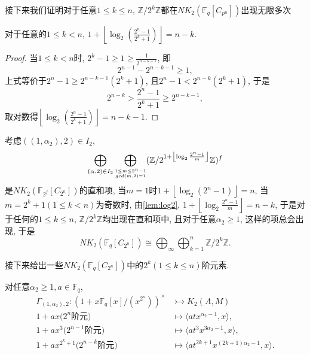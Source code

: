接下来我们证明对于任意$1\leq k\leq n$, $\mathbb{Z}/2^k \mathbb{Z}$都在$NK_2(\mathbb{F}_q[C_{p^n}])$出现无限多次

\begin{lemma}
\label{lem:log2}
	对于任意的$1\leq k < n$, $1+\left \lfloor \log_2(\frac{2^n-1}{2^k+1}) \right \rfloor = n-k$. 
\end{lemma}
\begin{proof}
	当$1\leq k < n$时, $2^k-1\geq 1 \geq \frac{1}{2^{n-k-1}}$, 即
	\[2^{n-1}-2^{n-k-1}\geq 1, \]
	上式等价于$2^n-1\geq 2^{n-k-1}(2^k+1)$, 且$2^n-1<2^{n-k}(2^k+1)$, 于是
	\[2^{n-k}> \frac{2^n-1}{2^k+1} \geq 2^{n-k-1}, \]
	取对数得$\left \lfloor \log_2(\frac{2^n-1}{2^k+1}) \right \rfloor = n-k-1$. 
\end{proof}
考虑$((1, \alpha_2), 2)\in I_2$, 
$$\bigoplus_{(\alpha, 2)\in I_2}\bigoplus_{\scriptsize\substack{1\leq m\leq  2^n-1 \\ gcd(m, 2)=1 }}(\mathbb{Z}/2^{1+ \left \lfloor\log_2 \frac{2^n-1}{m}  \right \rfloor}\mathbb{Z})^f$$
是$NK_2(\mathbb{F}_{2^f}[C_{2^n}])$的直和项, 当$m=1$时$1+ \left \lfloor\log_2 (2^n-1)\right \rfloor=n$, 当$m=2^k+1 (1\leq k < n)$为奇数时, 由\ref{lem:log2}, $1+ \left \lfloor\log_2 \frac{2^n-1}{m}\right \rfloor=n-k$, {\color{blue}于是对于任何的$1\leq k\leq n$, $\mathbb{Z}/2^k\mathbb{Z}$均出现在直和项中, 且对于任意$\alpha_2\geq 1$, 这样的项总会出现}, 于是
\[NK_2(\mathbb{F}_q[C_{2^n}])\cong \bigoplus_\infty \bigoplus_{k=1}^n \mathbb{Z}/2^k\mathbb{Z}. \]

接下来给出一些$NK_2(\mathbb{F}_q[C_{2^n}])$中的$2^k(1\leq k \leq n)$阶元素. 

对任意$\alpha_2\geq 1, a\in \mathbb{F}_q$, 
  \begin{align*}
 \Gamma_{(1, \alpha_2), 2} \colon (1+x \mathbb{F}_q[x]/(x^{2^n}))^{\times} &\rightarrowtail K_2(A, M)\\
 1+ax \text{($2^n$阶元)} &\mapsto \langle atx^{\alpha_2-1}, x \rangle, \\
 1+ax^3 \text{($2^{n-1}$阶元)} &\mapsto \langle at^3x^{3\alpha_2-1}, x \rangle, \\
 1+ax^{2^k+1} \text{($2^{n-k}$阶元)} &\mapsto \langle at^{2k+1}x^{(2k+1)\alpha_2-1}, x \rangle. 
 \end{align*}